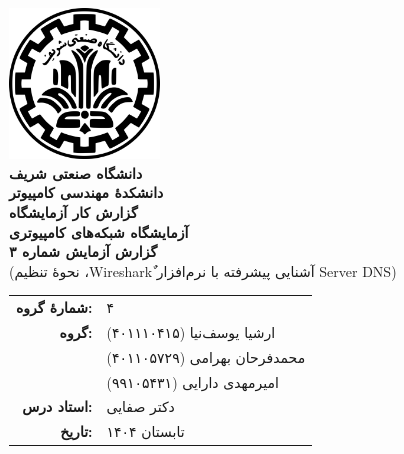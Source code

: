 \documentclass[12pt]{article}
\newcommand{\persianordinal}[1]{%
	\ifcase#1
	\or اول%
	\or دوم%
	\or سوم%
	\or چهارم%
	\or پنجم%
	\or ششم%
	\or هفتم%
	\or هشتم%
	\or نهم%
	\or دهم%
	\or یازدهم%
	\or دوازدهم%
	\or سیزدهم%
	\or چهاردهم%
	\or پانزدهم%
	\or شانزدهم%
	\or هفدهم%
	\or هجدهم%
	\or نوزدهم%
	\or بیستم%
	\else #1\fi
}
\newcommand{\persianordinalpage}{\persianfont\persianordinal{\value{page}}}
\begin{document}
	
	\begin{titlepage}
		\centering
		\vspace*{1cm}
		\includegraphics[width=4cm]{sharif.png}\\[1.5cm]
		{\Large\textbf{دانشگاه صنعتی شریف}}\\[0.5cm]
		{\large\textbf{دانشکدهٔ مهندسی کامپیوتر}}\\[1.5cm]
		{\Huge\textbf{گزارش کار آزمایشگاه}}\\[0.5cm]
		{\LARGE\textbf{آزمایشگاه شبکه‌های کامپیوتری}}\\[2cm]
		
		\textbf{گزارش آزمایش شماره ۳}\\
		(‫آشنایی ‬‫پیشرفته‬ ‫با‬ ‫نرم‌افزار \textenglish{ٌWireshark}، نحوهٔ ‬‫تنظیم‬ \textenglish{‫‪Server‬‬ ‫‪DNS}‬‬)
		
		\vfill
		\begin{tabular}{rl}
			\textbf{شمارهٔ گروه:} & ۴ \\
			\textbf{گروه:} &
			ارشیا یوسف‌نیا (۴۰۱۱۱۰۴۱۵) \\
			& محمد‌فرحان بهرامی (۴۰۱۱۰۵۷۲۹) \\
			& امیرمهدی دارایی (۹۹۱۰۵۴۳۱) \\
			\textbf{استاد درس:} & دکتر صفایی \\
			\textbf{تاریخ:} & تابستان ۱۴۰۴ \\
		\end{tabular}
	\end{titlepage}
	
	\clearpage
	\setcounter{page}{1}
	\renewcommand{\thepage}{\persianordinalpage}
	
	\tableofcontents
	\clearpage
	\listoffigures
	\clearpage
	\listoftables
	
	\clearpage
	\setcounter{page}{1}
	\renewcommand{\thepage}{\persianfont\arabic{page}}
	
\end{document}

